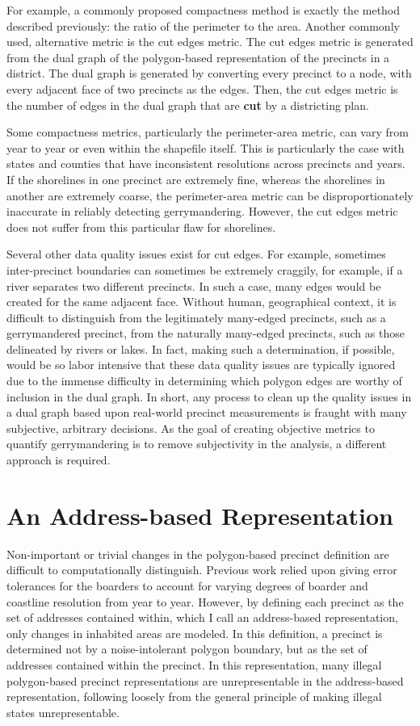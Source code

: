 \documentclass[11pt]{article}
\begin{document}
For example, a commonly proposed compactness method is exactly the method described previously: the ratio of the perimeter to the area. 
Another commonly used, alternative metric is the cut edges metric.
The cut edges metric is generated from the dual graph of the polygon-based representation of the precincts in a district.
The dual graph is generated by converting every precinct to a node, with every adjacent face of two precincts as the edges.
Then, the cut edges metric is the number of edges in the dual graph that are \textbf{cut} by a districting plan.

Some compactness metrics, particularly the perimeter-area metric, can vary from year to year or even within the shapefile itself.
This is particularly the case with states and counties that have inconsistent resolutions across precincts and years.
If the shorelines in one precinct are extremely fine, whereas the shorelines in another are extremely coarse, the perimeter-area metric can be disproportionately inaccurate in reliably detecting gerrymandering.
However, the cut edges metric does not suffer from this particular flaw for shorelines.

Several other data quality issues exist for cut edges. 
For example, sometimes inter-precinct boundaries can sometimes be extremely craggily, for example, if a river separates two different precincts. 
In such a case, many edges would be created for the same adjacent face. 
Without human, geographical context, it is difficult to distinguish from the legitimately many-edged precincts, such as a gerrymandered precinct, from the naturally many-edged precincts, such as those delineated by rivers or lakes.
In fact, making such a determination, if possible, would be so labor intensive that these data quality issues are typically ignored due to the immense difficulty in determining which polygon edges are worthy of inclusion in the dual graph.
In short, any process to clean up the quality issues in a dual graph based upon real-world precinct measurements is fraught with many subjective, arbitrary decisions.
As the goal of creating objective metrics to quantify gerrymandering is to remove subjectivity in the analysis, a different approach is required.

\section{An Address-based Representation}
\label{sec:org5767744}
Non-important or trivial changes in the polygon-based precinct definition are difficult to computationally distinguish. 
Previous work relied upon giving error tolerances for the boarders to account for varying degrees of boarder and coastline resolution from year to year. 
However, by defining each precinct as the set of addresses contained within, which I call an address-based representation, only changes in inhabited areas are modeled. 
In this definition, a precinct is determined not by a noise-intolerant polygon boundary, but as the set of addresses contained within the precinct.
In this representation, many illegal polygon-based precinct representations are unrepresentable in the address-based representation, following loosely from the general principle of making illegal states unrepresentable. 
\end{document}
